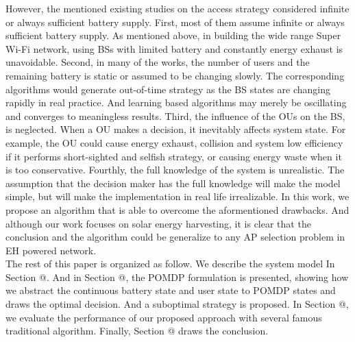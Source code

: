 \documentclass[conference]{IEEEtran}
\makeatletter
\newcommand{\Rmnum}[1]{\expandafter\@slowromancap\romannumeral #1@}
\makeatother
\begin{document}
\indent However, the mentioned existing studies on the access strategy considered infinite or always sufficient battery supply.
%
First, most of them assume infinite or always sufficient battery supply.
As mentioned above, in building the wide range Super Wi-Fi network,
using BSs with limited battery and constantly energy exhaust is unavoidable.
Second, in many of the works,
the number of users and the remaining battery is static or assumed to be changing slowly.
The corresponding algorithms would generate out-of-time strategy as the BS states are changing rapidly in real practice.
And learning based algorithms may merely be oscillating and converges to meaningless results.
Third, the influence of the OUs on the BS, is neglected.
When a OU makes a decision, it inevitably affects system state.
For example, the OU could cause energy exhaust,
collision and system low efficiency if it performs short-sighted and selfish strategy,
or causing energy waste when it is too conservative.
Fourthly, the full knowledge of the system is unrealistic.
The assumption that the decision maker has the full knowledge will make the model simple,
but will make the implementation in real life irrealizable.
In this work, we propose an algorithm that is able to overcome the aformentioned drawbacks.
And although our work focuses on solar energy harvesting,
it is clear that the conclusion and the algorithm could be generalize to any AP selection problem in EH powered network.
\\
\indent The rest of this paper is organized as follow.
We describe the system model In Section \Rmnum{2}.
And in Section \Rmnum{3}, the POMDP formulation is presented,
showing how we abstract the continuous battery state and user state to
POMDP states and draws the optimal decision. And a suboptimal strategy is proposed.
In Section \Rmnum{4}, we evaluate the performance of our proposed approach with several famous traditional algorithm.
Finally, Section \Rmnum{5} draws the conclusion.
\end{document}
